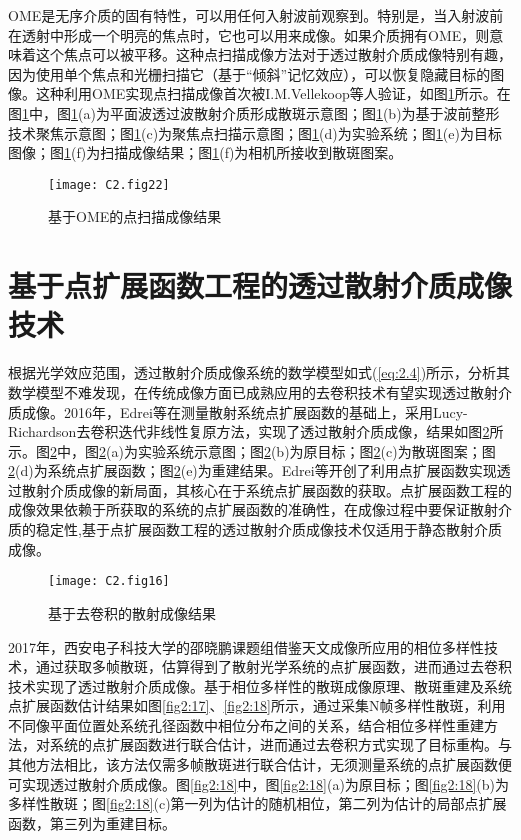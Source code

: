 OME是无序介质的固有特性，可以用任何入射波前观察到。特别是，当入射波前在透射中形成一个明亮的焦点时，它也可以用来成像。如果介质拥有OME，则意味着这个焦点可以被平移。这种点扫描成像方法对于透过散射介质成像特别有趣，因为使用单个焦点和光栅扫描它（基于“倾斜”记忆效应），可以恢复隐藏目标的图像。这种利用OME实现点扫描成像首次被I.M.Vellekoop等人验证\cite{vellekoop_scattered_2010}，如图\ref{fig2:22}所示\cite{vellekoop_scattered_2010}。在图\ref{fig2:22}中，图\ref{fig2:22}(a)为平面波透过波散射介质形成散斑示意图；图\ref{fig2:22}(b)为基于波前整形技术聚焦示意图；图\ref{fig2:22}(c)为聚焦点扫描示意图；图\ref{fig2:22}(d)为实验系统；图\ref{fig2:22}(e)为目标图像；图\ref{fig2:22}(f)为扫描成像结果；图\ref{fig2:22}(f)为相机所接收到散斑图案。

\begin{figure}[htp]
	\centering
	\texttt{[image: C2.fig22]}
	\caption{基于OME的点扫描成像结果}
	\label{fig2:22}
\end{figure}

\section{基于点扩展函数工程的透过散射介质成像技术}

根据光学效应范围，透过散射介质成像系统的数学模型如式(\ref{eq:2.4})所示，分析其数学模型不难发现，在传统成像方面已成熟应用的去卷积技术有望实现透过散射介质成像。2016年，Edrei等\cite{edrei_memory-effect_2016}在测量散射系统点扩展函数的基础上，采用Lucy-Richardson去卷积迭代非线性复原方法\cite{richardson_bayesian-based_1972,1974AJ_79_745L}，实现了透过散射介质成像，结果如图\ref{fig2:16}所示\cite{edrei_memory-effect_2016}。图\ref{fig2:16}中，图\ref{fig2:16}(a)为实验系统示意图；图\ref{fig2:16}(b)为原目标；图\ref{fig2:16}(c)为散斑图案；图\ref{fig2:16}(d)为系统点扩展函数；图\ref{fig2:16}(e)为重建结果。Edrei等开创了利用点扩展函数实现透过散射介质成像的新局面，其核心在于系统点扩展函数的获取。点扩展函数工程的成像效果依赖于所获取的系统的点扩展函数的准确性，在成像过程中要保证散射介质的稳定性,基于点扩展函数工程的透过散射介质成像技术仅适用于静态散射介质成像。

\begin{figure}[htp]
	\centering
	\texttt{[image: C2.fig16]}
	\caption{基于去卷积的散射成像结果}
	\label{fig2:16}
\end{figure}

2017年，西安电子科技大学的邵晓鹏课题组\cite{wu_imaging_2017}借鉴天文成像所应用的相位多样性技术，通过获取多帧散斑，估算得到了散射光学系统的点扩展函数，进而通过去卷积技术实现了透过散射介质成像。基于相位多样性的散斑成像原理、散斑重建及系统点扩展函数估计结果如图\ref{fig2:17}、\ref{fig2:18}所示\cite{wu_imaging_2017}，通过采集N帧多样性散斑，利用不同像平面位置处系统孔径函数中相位分布之间的关系，结合相位多样性重建方法，对系统的点扩展函数进行联合估计，进而通过去卷积方式实现了目标重构。与其他方法相比，该方法仅需多帧散斑进行联合估计，无须测量系统的点扩展函数便可实现透过散射介质成像。图\ref{fig2:18}中，图\ref{fig2:18}(a)为原目标；图\ref{fig2:18}(b)为多样性散斑；图\ref{fig2:18}(c)第一列为估计的随机相位，第二列为估计的局部点扩展函数，第三列为重建目标。

